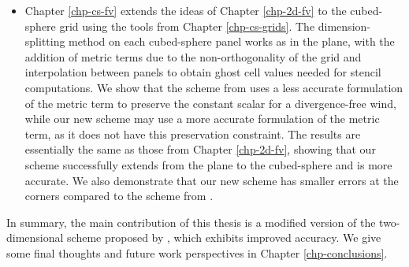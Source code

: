 \begin{itemize}
\item Chapter \ref{chp-cs-fv} extends the ideas of Chapter \ref{chp-2d-fv} to the cubed-sphere grid using the tools from Chapter \ref{chp-cs-grids}.
The dimension-splitting method on each cubed-sphere panel works as in the plane, 
with the addition of metric terms due to the non-orthogonality of the grid and interpolation between panels to obtain ghost cell values needed for stencil computations. 
We show that the scheme from \citet{putman:2007} uses a less accurate formulation of the metric term to preserve the constant scalar for a divergence-free wind,
while our new scheme may use a more accurate formulation of the metric term, as it does not have this preservation constraint. 
The results are essentially the same as those from Chapter \ref{chp-2d-fv}, 
showing that our scheme successfully extends from the plane to the cubed-sphere and is more accurate. 
We also demonstrate that our new scheme has smaller errors at the corners compared to the scheme from \citet{putman:2007}.
\end{itemize}

In summary, the main contribution of this thesis is a modified version of the two-dimensional scheme proposed by \citet{putman:2007}, which exhibits improved accuracy.
We give some final thoughts and future work perspectives in Chapter \ref{chp-conclusions}.